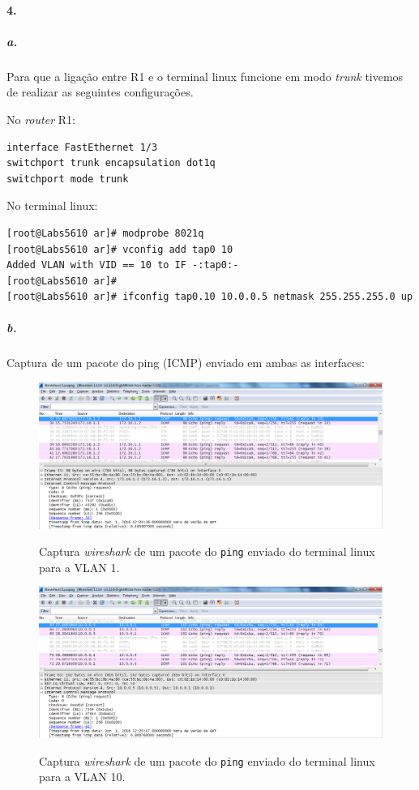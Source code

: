 \paragraph{4.}

\subparagraph{a.}
Para que a ligação entre \textsf{R1} e o terminal \textsf{linux} funcione em modo \emph{trunk} tivemos de realizar as seguintes configurações.

No \emph{router} \textsf{R1}:
\begin{verbatim}
interface FastEthernet 1/3
switchport trunk encapsulation dot1q
switchport mode trunk
\end{verbatim}

No terminal \textsf{linux}:
\begin{verbatim}
[root@Labs5610 ar]# modprobe 8021q
[root@Labs5610 ar]# vconfig add tap0 10
Added VLAN with VID == 10 to IF -:tap0:-
[root@Labs5610 ar]# 
[root@Labs5610 ar]# ifconfig tap0.10 10.0.0.5 netmask 255.255.255.0 up
\end{verbatim}

\newpage

\subparagraph{b.}
Captura de um pacote do \textsf{ping} (ICMP) enviado em ambas as interfaces:

\begin{figure}[h]
\centering
\includegraphics[width=1\textwidth, height=0.32\textheight]{4_ping_VLAN1.png}
\label{fig:5-capturaWireshark}
\caption{Captura \emph{wireshark} de um pacote do \texttt{ping} enviado do terminal \textsf{linux} para a \textsf{VLAN 1}.}
\end{figure}

\begin{figure}[h]
\centering
\includegraphics[width=1\textwidth, height=0.32\textheight]{4_ping_VLAN10.png}
\label{fig:6-capturaWireshark}
\caption{Captura \emph{wireshark} de um pacote do \texttt{ping} enviado do terminal \textsf{linux} para a \textsf{VLAN 10}.}
\end{figure}


